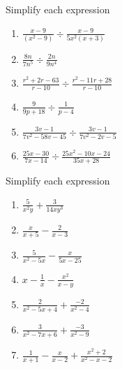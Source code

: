\documentclass[12pt]{article}
\newenvironment{problem}[2][Problem]{\begin{trivlist}
\item[\hskip \labelsep {\bfseries #1}\hskip \labelsep {\bfseries #2.}]}{\end{trivlist}}
\newenvironment{sol}
    {\emph{Solution:}
    }
    {
    \qed
    }
\begin{document}
\begin{problem}{4}
  Simplify each expression
  \begin{enumerate}[label=\roman*)]
  \item $\displaystyle \frac{x-9}{(x^2-9)}\div\frac{x-9}{5x^2(x+3)}$
  \item $\displaystyle \frac{8n}{7n^5}\div\frac{2n}{9n^4}$
  \item $\displaystyle \frac{r^2+2r-63}{r-10}\div\frac{r^2-11r+28}{r-10}$
  \item $\displaystyle \frac{9}{9p+18}\div\frac{1}{p-4}$
  \item $\displaystyle \frac{3v-1}{7v^2-58v-45}\div\frac{3v-1}{7v^2-2v-5}$
  \item $\displaystyle \frac{25x-30}{7x-14}\div\frac{25x^2-10x-24}{35x+28}$    
  \end{enumerate}  
\end{problem}

\begin{problem}{5}
  Simplify each expression
  \begin{enumerate}[label=\roman*)]
  \item $\displaystyle \frac{5}{x^2y} + \frac{3}{14xy^3}$
  \item $\displaystyle \frac{x}{x+5} - \frac{2}{x-3}$  
  \item $\displaystyle \frac{5}{x^2-5x} - \frac{x}{5x-25}$
  \item $\displaystyle x - \frac{1}{x} - \frac{x^2}{x-y}$
  \item $\displaystyle \frac{2}{x^2-5x+4} + \frac{-2}{x^2-4}$
  \item $\displaystyle \frac{3}{x^2-7x+6}+ \frac{-3}{x^2-9}$
    \item $\displaystyle \frac{1}{x+1} - \frac{x}{x-2} + \frac{x^2+2}{x^2-x-2}$
  \end{enumerate}
  
\end{problem}






\end{document}
